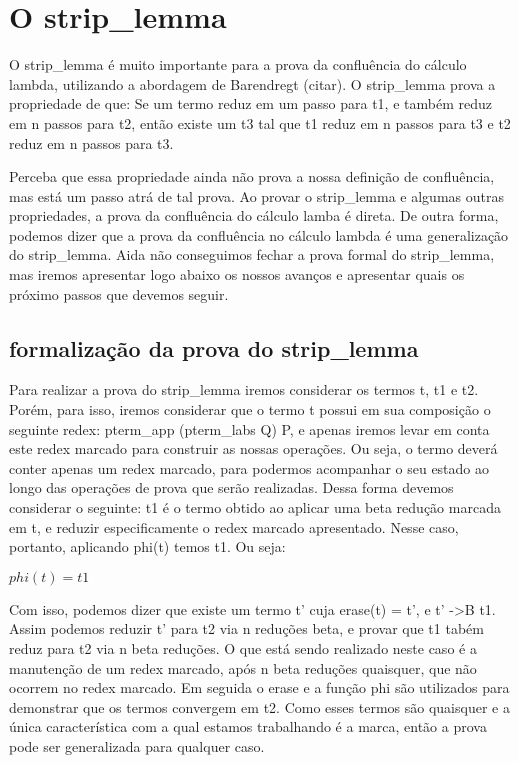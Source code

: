 \section{O strip\_lemma}



 O strip\_lemma é muito importante para a prova da confluência do cálculo lambda, utilizando
a abordagem de Barendregt (citar). O strip\_lemma prova a propriedade de que: Se um termo reduz em um
passo para t1, e também reduz em n passos para t2, então existe um t3 tal que t1 reduz em n passos para t3
e t2 reduz em n passos para t3. 

 Perceba que essa propriedade ainda não prova a nossa definição de confluência, mas está um passo
atrá de tal prova. Ao provar o strip\_lemma e algumas outras propriedades, a prova da confluência do cálculo
lamba é direta. De outra forma, podemos dizer que a prova da confluência no cálculo lambda é uma 
generalização do strip\_lemma. Aida não conseguimos fechar a prova formal do strip\_lemma, mas iremos
apresentar logo abaixo os nossos avanços e apresentar quais os próximo passos que devemos seguir.

\subsection{formalização da prova do strip\_lemma}



 Para realizar a prova do strip\_lemma iremos considerar os termos t, t1 e t2. Porém, para isso, iremos
considerar que o termo t possui em sua composição o seguinte redex: pterm\_app (pterm\_labs Q) P, e apenas
iremos levar em conta este redex marcado para construir as nossas operações. Ou seja, o termo deverá conter apenas
um redex marcado, para podermos acompanhar o seu estado ao longo das operações de prova que serão realizadas.
Dessa forma devemos considerar o seguinte: t1 é o termo obtido ao aplicar uma beta redução marcada em t, 
e reduzir especificamente o redex marcado apresentado. Nesse caso, portanto, aplicando phi(t) temos t1. Ou seja:

 $ phi(t) = t1 $ 

 Com isso, podemos dizer que existe um termo t' cuja erase(t) = t', e t' ->B t1. Assim
podemos reduzir t' para t2 via n reduções beta, e provar que t1 tabém reduz para t2 via n beta reduções. O que está sendo 
realizado neste caso é a manutenção de um redex marcado, após n beta reduções quaisquer, que não ocorrem no redex marcado. 
Em seguida o erase e a função phi são utilizados para demonstrar que os termos convergem em t2. Como esses termos são quaisquer
e a única característica com a qual estamos trabalhando é a marca, então a prova pode ser generalizada para qualquer caso.

